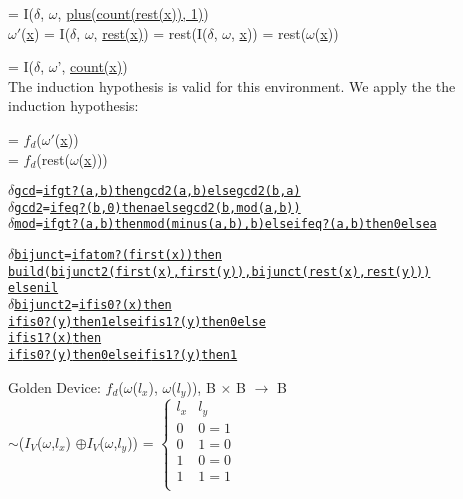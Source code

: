 \documentclass[10pt, a4paper]{article}
\begin{document}
\begin{description}
                
                 = I($\delta$, $\omega$, \underline{plus(count(rest(x)), 1)}) \\
                $\omega'$(\underline{x}) = I($\delta$, $\omega$, \underline{rest(x)}) =
                rest(I($\delta$, $\omega$, \underline{x})) = rest($\omega$(\underline{x}))
                
                = I($\delta$, $\omega$', \underline{count(x)}) \\
                
                The induction hypothesis is valid for this environment. We apply the the induction 
                hypothesis:
                
                = $f_d$($\omega'$(\underline{x})) \\
                = $f_d$(rest($\omega$(\underline{x})))
                
    \end{description}

    \begin{alltt}
        \(\delta\) \underline{gcd} = \underline{if gt?(a,b) then gcd2(a,b) else gcd2(b,a)} 
        \(\delta\) \underline{gcd2} = \underline{if eq?(b,0) then a else gcd2(b, mod(a,b))} 
        \(\delta\) \underline{mod} = \underline{if gt?(a,b) then mod(minus(a,b), b) else if eq?(a,b) then 0 else a}
    \end{alltt}

    \begin{alltt}
    \(\delta\) \underline{bijunct} = \underline{if atom?( first(x) ) then}  
        \underline{build( bijunct2(first(x), first(y)), bijunct(rest(x),rest(y)) )} 
        \underline{else} \underline{nil}
    \(\delta\)\underline{bijunct2} = \underline{if is0?(x) then}
        \underline{if is0?(y) then 1 else if is1?(y) then 0 else}
        \underline{if is1?(x) then}
        \underline{if is0?(y) then 0 else if is1?(y) then 1} 
    \end{alltt}
    
    Golden Device: $f_d$($\omega$($l_x$), $\omega$($l_y$)),  B $\times$ B $\rightarrow$ B \\
    $\sim$($I_{V}$($\omega$,$l_x$) $\mathbin{\oplus} I_V$($\omega$,$l_y$)) =
    $\left\{
        \begin{array}{ll}
             \textbf{$l_x$} & \textbf{$l_y$} \\
             0 & 0 = 1 \\
             0 & 1 = 0 \\
             1 & 0 = 0 \\
             1 & 1 = 1 \\
        \end{array}
    \right.$
    
\end{document}
